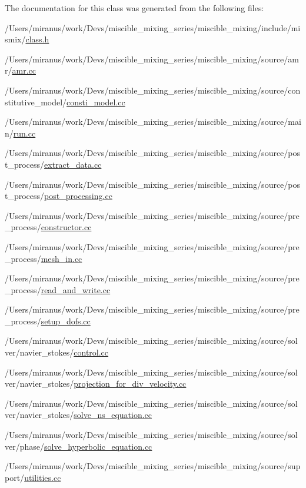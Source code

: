The documentation for this class was generated from the following files\+:\begin{DoxyCompactItemize}
\item 
/\+Users/miranus/work/\+Devs/miscible\+\_\+mixing\+\_\+series/miscible\+\_\+mixing/include/mismix/\hyperlink{class_8h}{class.\+h}\item 
/\+Users/miranus/work/\+Devs/miscible\+\_\+mixing\+\_\+series/miscible\+\_\+mixing/source/amr/\hyperlink{amr_8cc}{amr.\+cc}\item 
/\+Users/miranus/work/\+Devs/miscible\+\_\+mixing\+\_\+series/miscible\+\_\+mixing/source/constitutive\+\_\+model/\hyperlink{consti__model_8cc}{consti\+\_\+model.\+cc}\item 
/\+Users/miranus/work/\+Devs/miscible\+\_\+mixing\+\_\+series/miscible\+\_\+mixing/source/main/\hyperlink{run_8cc}{run.\+cc}\item 
/\+Users/miranus/work/\+Devs/miscible\+\_\+mixing\+\_\+series/miscible\+\_\+mixing/source/post\+\_\+process/\hyperlink{extract__data_8cc}{extract\+\_\+data.\+cc}\item 
/\+Users/miranus/work/\+Devs/miscible\+\_\+mixing\+\_\+series/miscible\+\_\+mixing/source/post\+\_\+process/\hyperlink{post__processing_8cc}{post\+\_\+processing.\+cc}\item 
/\+Users/miranus/work/\+Devs/miscible\+\_\+mixing\+\_\+series/miscible\+\_\+mixing/source/pre\+\_\+process/\hyperlink{constructor_8cc}{constructor.\+cc}\item 
/\+Users/miranus/work/\+Devs/miscible\+\_\+mixing\+\_\+series/miscible\+\_\+mixing/source/pre\+\_\+process/\hyperlink{mesh__in_8cc}{mesh\+\_\+in.\+cc}\item 
/\+Users/miranus/work/\+Devs/miscible\+\_\+mixing\+\_\+series/miscible\+\_\+mixing/source/pre\+\_\+process/\hyperlink{read__and__write_8cc}{read\+\_\+and\+\_\+write.\+cc}\item 
/\+Users/miranus/work/\+Devs/miscible\+\_\+mixing\+\_\+series/miscible\+\_\+mixing/source/pre\+\_\+process/\hyperlink{setup__dofs_8cc}{setup\+\_\+dofs.\+cc}\item 
/\+Users/miranus/work/\+Devs/miscible\+\_\+mixing\+\_\+series/miscible\+\_\+mixing/source/solver/navier\+\_\+stokes/\hyperlink{control_8cc}{control.\+cc}\item 
/\+Users/miranus/work/\+Devs/miscible\+\_\+mixing\+\_\+series/miscible\+\_\+mixing/source/solver/navier\+\_\+stokes/\hyperlink{projection__for__div__velocity_8cc}{projection\+\_\+for\+\_\+div\+\_\+velocity.\+cc}\item 
/\+Users/miranus/work/\+Devs/miscible\+\_\+mixing\+\_\+series/miscible\+\_\+mixing/source/solver/navier\+\_\+stokes/\hyperlink{solve__ns__equation_8cc}{solve\+\_\+ns\+\_\+equation.\+cc}\item 
/\+Users/miranus/work/\+Devs/miscible\+\_\+mixing\+\_\+series/miscible\+\_\+mixing/source/solver/phase/\hyperlink{solve__hyperbolic__equation_8cc}{solve\+\_\+hyperbolic\+\_\+equation.\+cc}\item 
/\+Users/miranus/work/\+Devs/miscible\+\_\+mixing\+\_\+series/miscible\+\_\+mixing/source/support/\hyperlink{utilities_8cc}{utilities.\+cc}\end{DoxyCompactItemize}
